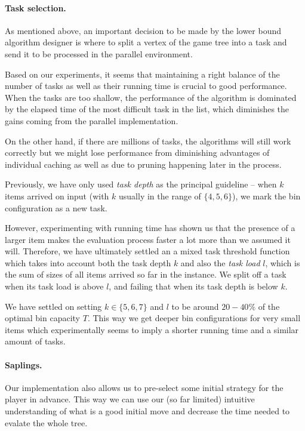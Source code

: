 \paragraph{Task selection.} As mentioned above, an important decision
to be made by the lower bound algorithm designer is where to split a
vertex of the game tree into a task and send it to be processed in the
parallel environment.

Based on our experiments, it seems that maintaining a right balance of
the number of tasks as well as their running time is crucial to good
performance. When the tasks are too shallow, the performance of the
algorithm is dominated by the elapsed time of the most difficult task
in the list, which diminishes the gains coming from the parallel
implementation.

On the other hand, if there are millions of tasks, the algorithms will
still work correctly but we might lose performance from diminishing
advantages of individual caching as well as due to pruning happening
later in the process.

Previously, we have only used \emph{task depth} as the principal
guideline -- when $k$ items arrived on input (with $k$ usually in the
range of $\{4,5,6\}$), we mark the bin configuration as a new task.

However, experimenting with running time has shown us that the
presence of a larger item makes the evaluation process faster a lot
more than we assumed it will. Therefore, we have ultimately settled an
a mixed task threshold function which takes into account both the task
depth $k$ and also the \emph{task load} $l$, which is the sum of sizes
of all items arrived so far in the instance. We split off a task when
its task load is above $l$, and failing that when its task depth is
below $k$.

We have settled on setting $k \in \{5,6,7\}$ and $l$ to be around
$20-40\%$ of the optimal bin capacity $T$. This way we get deeper bin
configurations for very small items which experimentally seems to
imply a shorter running time and a similar amount of tasks.

\paragraph{Saplings.} Our implementation also allows us to pre-select
some initial strategy for the player \adversary in advance. This way
we can use our (so far limited) intuitive understanding of what is a
good initial move and decrease the time needed to evalate the whole
tree.

